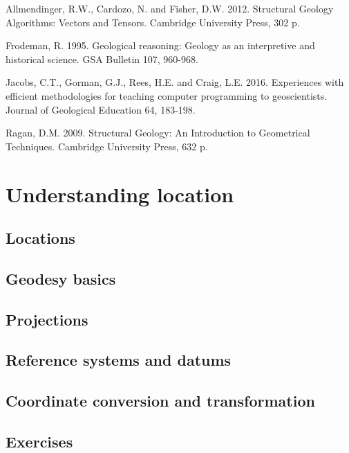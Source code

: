\documentclass[a4paper , 12pt]{book}
\begin{document}
Allmendinger, R.W., Cardozo, N. and Fisher, D.W. 2012. Structural Geology Algorithms: Vectors and Tensors. Cambridge University Press, 302 p.

Frodeman, R. 1995. Geological reasoning: Geology as an interpretive and historical science. GSA Bulletin 107, 960-968.

Jacobs, C.T., Gorman, G.J., Rees, H.E. and Craig, L.E. 2016. Experiences with efficient methodologies for teaching computer programming to geoscientists. Journal of Geological Education 64, 183-198.

Ragan, D.M. 2009. Structural Geology: An Introduction to Geometrical Techniques. Cambridge University Press, 632 p.

\chapter{Understanding location}

\section{Locations}

\section{Geodesy basics}

\section{Projections}

\section{Reference systems and datums}

\section{Coordinate conversion and transformation}

\section{Exercises}
\end{document}
